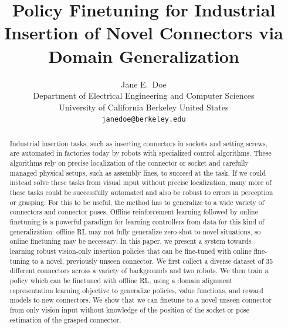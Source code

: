 \documentclass{article}
\title{Policy Finetuning for Industrial Insertion of Novel Connectors via Domain Generalization}
\author{
  Jane E.~Doe\\
  Department of Electrical Engineering and Computer Sciences\\
  University of California Berkeley 
  United States\\
  \texttt{janedoe@berkeley.edu} \\
}
\newcommand{\numconnectors}{35}
\begin{document}
\maketitle


\begin{abstract}
Industrial insertion tasks, such as inserting connectors in sockets and setting screws, are automated in factories today by robots with specialized control algorithms.
These algorithms rely on precise localization of the connector or socket and carefully managed physical setups, such as assembly lines, to succeed at the task.
If we could instead solve these tasks from visual input without precise localization, many more of these tasks could be successfully automated and also be robust to errors in perception or grasping.
For this to be useful, the method has to generalize to a wide variety of connectors and connector poses.
Offline reinforcement learning followed by online finetuning is a powerful paradigm for learning controllers from data for this kind of generalization: offline RL may not fully generalize zero-shot to novel situations, so online finetuning may be necessary.
In this paper, we present a system towards learning robust vision-only insertion policies that can be fine-tuned with online fine-tuning to a novel, previously unseen connector.
We first collect a diverse dataset of \numconnectors{} different connectors across a variety of backgrounds and two robots.
We then train a policy which can be finetuned with offline RL, using a domain alignment representation learning objective to generalize policies, value functions, and reward models to new connectors.
We show that we can finetune to a novel unseen connector from only vision input without knowledge of the position of the socket or pose estimation of the grasped connector.


\end{abstract}
\end{document}
